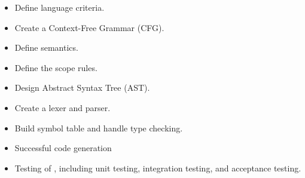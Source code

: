 \begin{itemize}
  \item Define language criteria.
  \item Create a Context-Free Grammar (CFG).
  \item Define semantics.
  \item Define the scope rules.
  \item Design Abstract Syntax Tree (AST).
  \item Create a lexer and parser.
  \item Build symbol table and handle type checking.
  \item Successful code generation
  \item Testing of \lang, including unit testing, integration testing, and acceptance testing.
\end{itemize}
